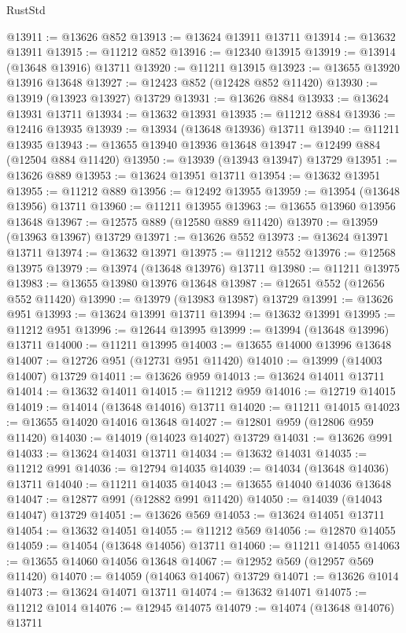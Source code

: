 \begin{lexlean}{RustStd}
\begin{coremodule}
@13911 := @13626 @852
@13913 := @13624 @13911 @13711
@13914 := @13632 @13911
@13915 := @11212 @852
@13916 := @12340 @13915
@13919 := @13914 (@13648 @13916) @13711
@13920 := @11211 @13915
@13923 := @13655 @13920 @13916 @13648
@13927 := @12423 @852 (@12428 @852 @11420)
@13930 := @13919 (@13923 @13927) @13729
@13931 := @13626 @884
@13933 := @13624 @13931 @13711
@13934 := @13632 @13931
@13935 := @11212 @884
@13936 := @12416 @13935
@13939 := @13934 (@13648 @13936) @13711
@13940 := @11211 @13935
@13943 := @13655 @13940 @13936 @13648
@13947 := @12499 @884 (@12504 @884 @11420)
@13950 := @13939 (@13943 @13947) @13729
@13951 := @13626 @889
@13953 := @13624 @13951 @13711
@13954 := @13632 @13951
@13955 := @11212 @889
@13956 := @12492 @13955
@13959 := @13954 (@13648 @13956) @13711
@13960 := @11211 @13955
@13963 := @13655 @13960 @13956 @13648
@13967 := @12575 @889 (@12580 @889 @11420)
@13970 := @13959 (@13963 @13967) @13729
@13971 := @13626 @552
@13973 := @13624 @13971 @13711
@13974 := @13632 @13971
@13975 := @11212 @552
@13976 := @12568 @13975
@13979 := @13974 (@13648 @13976) @13711
@13980 := @11211 @13975
@13983 := @13655 @13980 @13976 @13648
@13987 := @12651 @552 (@12656 @552 @11420)
@13990 := @13979 (@13983 @13987) @13729
@13991 := @13626 @951
@13993 := @13624 @13991 @13711
@13994 := @13632 @13991
@13995 := @11212 @951
@13996 := @12644 @13995
@13999 := @13994 (@13648 @13996) @13711
@14000 := @11211 @13995
@14003 := @13655 @14000 @13996 @13648
@14007 := @12726 @951 (@12731 @951 @11420)
@14010 := @13999 (@14003 @14007) @13729
@14011 := @13626 @959
@14013 := @13624 @14011 @13711
@14014 := @13632 @14011
@14015 := @11212 @959
@14016 := @12719 @14015
@14019 := @14014 (@13648 @14016) @13711
@14020 := @11211 @14015
@14023 := @13655 @14020 @14016 @13648
@14027 := @12801 @959 (@12806 @959 @11420)
@14030 := @14019 (@14023 @14027) @13729
@14031 := @13626 @991
@14033 := @13624 @14031 @13711
@14034 := @13632 @14031
@14035 := @11212 @991
@14036 := @12794 @14035
@14039 := @14034 (@13648 @14036) @13711
@14040 := @11211 @14035
@14043 := @13655 @14040 @14036 @13648
@14047 := @12877 @991 (@12882 @991 @11420)
@14050 := @14039 (@14043 @14047) @13729
@14051 := @13626 @569
@14053 := @13624 @14051 @13711
@14054 := @13632 @14051
@14055 := @11212 @569
@14056 := @12870 @14055
@14059 := @14054 (@13648 @14056) @13711
@14060 := @11211 @14055
@14063 := @13655 @14060 @14056 @13648
@14067 := @12952 @569 (@12957 @569 @11420)
@14070 := @14059 (@14063 @14067) @13729
@14071 := @13626 @1014
@14073 := @13624 @14071 @13711
@14074 := @13632 @14071
@14075 := @11212 @1014
@14076 := @12945 @14075
@14079 := @14074 (@13648 @14076) @13711

\end{coremodule}
\end{lexlean}
